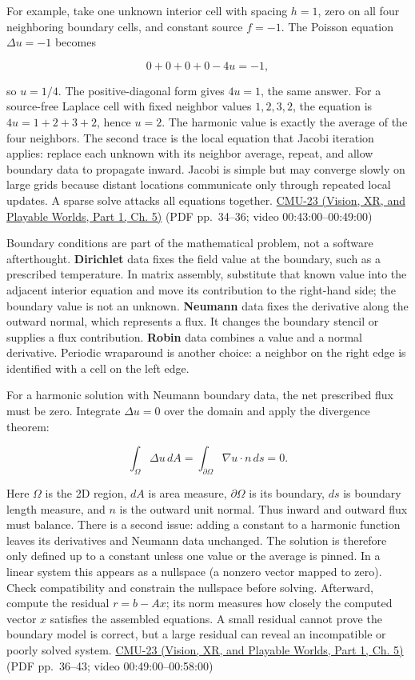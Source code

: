 For example, take one unknown interior cell with spacing \(h=1\), zero on all four neighboring boundary cells, and constant source \(f=-1\). The Poisson equation \(\Delta u=-1\) becomes

\[
0+0+0+0-4u=-1,
\]

so \(u=1/4\). The positive-diagonal form gives \(4u=1\), the same answer. For a source-free Laplace cell with fixed neighbor values \(1,2,3,2\), the equation is \(4u=1+2+3+2\), hence \(u=2\). The harmonic value is exactly the average of the four neighbors. The second trace is the local equation that Jacobi iteration applies: replace each unknown with its neighbor average, repeat, and allow boundary data to propagate inward. Jacobi is simple but may converge slowly on large grids because distant locations communicate only through repeated local updates. A sparse solve attacks all equations together. \href{../07-Vision-XR-and-Playable-Worlds-P01/main.pdf\#nameddest=04-visual-computing-ii-ch036-cmu-23---physically-based-animation-and-pdes}{CMU-23 (Vision, XR, and Playable Worlds, Part 1, Ch. 5)} (PDF pp.~34--36; video 00:43:00--00:49:00)

Boundary conditions are part of the mathematical problem, not a software afterthought. \textbf{Dirichlet} data fixes the field value at the boundary, such as a prescribed temperature. In matrix assembly, substitute that known value into the adjacent interior equation and move its contribution to the right-hand side; the boundary value is not an unknown. \textbf{Neumann} data fixes the derivative along the outward normal, which represents a flux. It changes the boundary stencil or supplies a flux contribution. \textbf{Robin} data combines a value and a normal derivative. Periodic wraparound is another choice: a neighbor on the right edge is identified with a cell on the left edge.

For a harmonic solution with Neumann boundary data, the net prescribed flux must be zero. Integrate \(\Delta u=0\) over the domain and apply the divergence theorem:

\[
\int_\Omega \Delta u\,dA
=\int_{\partial\Omega}\nabla u\cdot n\,ds
=0.
\]

Here \(\Omega\) is the 2D region, \(dA\) is area measure, \(\partial\Omega\) is its boundary, \(ds\) is boundary length measure, and \(n\) is the outward unit normal. Thus inward and outward flux must balance. There is a second issue: adding a constant to a harmonic function leaves its derivatives and Neumann data unchanged. The solution is therefore only defined up to a constant unless one value or the average is pinned. In a linear system this appears as a nullspace (a nonzero vector mapped to zero). Check compatibility and constrain the nullspace before solving. Afterward, compute the residual \(r=b-Ax\); its norm measures how closely the computed vector \(x\) satisfies the assembled equations. A small residual cannot prove the boundary model is correct, but a large residual can reveal an incompatible or poorly solved system. \href{../07-Vision-XR-and-Playable-Worlds-P01/main.pdf\#nameddest=04-visual-computing-ii-ch036-cmu-23---physically-based-animation-and-pdes}{CMU-23 (Vision, XR, and Playable Worlds, Part 1, Ch. 5)} (PDF pp.~36--43; video 00:49:00--00:58:00)

